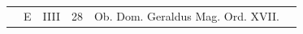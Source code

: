 \documentclass[openany]{book}
\renewcommand{\\}{\par\hspace*{.1em}} %
\begin{document}
\begin{center}
\begin{tabular}{l | l | l | r | l l}
\color{Red}  & E & \color{Red} IIII & 28 & Ob. Dom. Geraldus Mag. Ord. XVII. & \color{Red} \\



\end{tabular}
\end{center}
\end{document}
